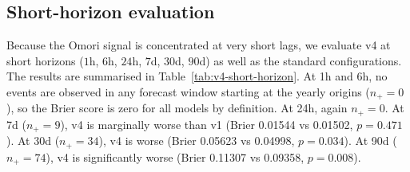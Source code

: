 \documentclass[10pt,a4paper,twocolumn]{article}
\begin{document}
\begin{table}[t]
\centering
\caption{v4 depth-stratified clustering diagnostics.}\label{tab:v4-depth}
\footnotesize
{}
\end{table}

\subsection{Short-horizon evaluation}

Because the Omori signal is concentrated at very short lags, we evaluate v4 at short horizons ($1$h, $6$h, $24$h, $7$d, $30$d, $90$d) as well as the standard configurations. The results are summarised in Table~\ref{tab:v4-short-horizon}. At 1h and 6h, no events are observed in any forecast window starting at the yearly origins ($n_+=0$), so the Brier score is zero for all models by definition. At 24h, again $n_+=0$. At 7d ($n_+=9$), v4 is marginally worse than v1 (Brier 0.01544 vs 0.01502, $p=0.471$). At 30d ($n_+=34$), v4 is worse (Brier 0.05623 vs 0.04998, $p=0.034$). At 90d ($n_+=74$), v4 is significantly worse (Brier 0.11307 vs 0.09358, $p=0.008$).
\end{document}
